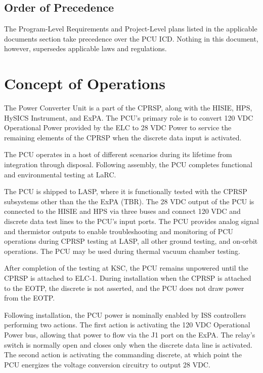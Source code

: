 \documentclass[12pt,oneside,oldfontcommands]{memoir}
\begin{document}
\section{Order of Precedence }
\label{orderofprecedence}

The Program-Level Requirements and Project-Level plans listed in the applicable documents section take precedence over the \gls{PCU} \gls{ICD}. Nothing in this document, however, supersedes applicable laws and regulations.

\chapter{Concept of Operations  }
\label{conops}

The Power Converter Unit is a part of the \gls{CPRSP}, along with the \gls{HISIE}, \gls{HPS}, \gls{HySICS} Instrument, and \gls{ExPA}. The \gls{PCU}'s primary role is to convert 120 \gls{VDC} Operational Power provided by the \gls{ELC} to 28 \gls{VDC} Power to service the remaining elements of the \gls{CPRSP} when the discrete data input is activated.

The \gls{PCU} operates in a host of different scenarios during its lifetime from integration through disposal. Following assembly, the \gls{PCU} completes functional and environmental testing at \gls{LaRC}.

The \gls{PCU} is shipped to \gls{LASP}, where it is functionally tested with the \gls{CPRSP} subsystems other than the the \gls{ExPA} (TBR\label{tbx_1}). The 28 \gls{VDC} output of the \gls{PCU} is connected to the \gls{HISIE} and \gls{HPS} via three buses and connect 120 \gls{VDC} and discrete data test lines to the \gls{PCU}'s input ports. The \gls{PCU} provides analog signal and thermistor outputs to enable troubleshooting and monitoring of \gls{PCU} operations during \gls{CPRSP} testing at \gls{LASP}, all other ground testing, and on-orbit operations. The \gls{PCU} may be used during thermal vacuum chamber testing.

After completion of the testing at \gls{KSC}, the \gls{PCU} remains unpowered until the \gls{CPRSP} is attached to \gls{ELC}-1. During installation when the \gls{CPRSP} is attached to the \gls{EOTP}, the discrete is not asserted, and the \gls{PCU} does not draw power from the \gls{EOTP}.

Following installation, the \gls{PCU} power is nominally enabled by \gls{ISS} controllers performing two actions. The first action is activating the 120 \gls{VDC} Operational Power bus, allowing that power to flow via the J1 port on the \gls{ExPA}. The relay's switch is normally open and closes only when the discrete data line is activated. The second action is activating the commanding discrete, at which point the \gls{PCU} energizes the voltage conversion circuitry to output 28 \gls{VDC}.
\end{document}
